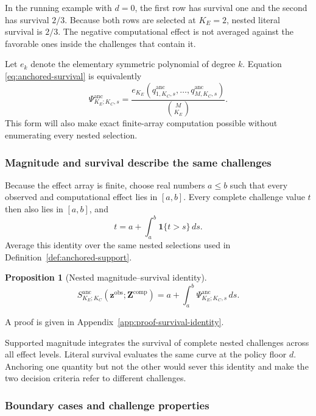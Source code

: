 \documentclass[11pt]{article}
\newcommand{\Sanc}{S^{\mathrm{anc}}}
\newcommand{\Psianc}{\Psi^{\mathrm{anc}}}
\newtheorem{proposition}{Proposition}
\theoremstyle{remark}
\begin{document}
In the running example with $d=0$, the first row has survival one and the
second has survival $2/3$. Because both rows are selected at $K_E=2$, nested
literal survival is $2/3$. The negative computational effect is not averaged
against the favorable ones inside the challenges that contain it.

Let $e_k$ denote the elementary symmetric polynomial of degree $k$. Equation
\eqref{eq:anchored-survival} is equivalently
\begin{equation}
\Psianc_{K_E;K_C,s}
=
\frac{e_{K_E}\left(
q^{\mathrm{anc}}_{1,K_C,s},\ldots,
q^{\mathrm{anc}}_{M,K_C,s}
\right)}{\binom{M}{K_E}}.
\label{eq:elementary-symmetric}
\end{equation}
This form will also make exact finite-array computation possible without
enumerating every nested selection.

\subsubsection{Magnitude and survival describe the same challenges}

Because the effect array is finite, choose real numbers $a\leq b$ such that
every observed and computational effect lies in $[a,b]$. Every complete
challenge value $t$ then also lies in $[a,b]$, and
\[
t=a+\int_a^b\mathbf 1\{t>s\}\,ds.
\]
Average this identity over the same nested selections used in
Definition~\ref{def:anchored-support}.

\begin{proposition}[Nested magnitude--survival identity]
\label{prop:survival-identity}
\begin{equation}
\Sanc_{K_E;K_C}
\left(\mathbf z^{\mathrm{obs}};\mathbf Z^{\mathrm{comp}}\right)
=
a+
\int_a^b
\Psianc_{K_E;K_C,s}\,ds.
\label{eq:nested-survival-identity}
\end{equation}
\end{proposition}

A proof is given in Appendix~\ref{app:proof-survival-identity}.

Supported magnitude integrates the survival of complete nested challenges
across all effect levels. Literal survival evaluates the same curve at the
policy floor $d$. Anchoring one quantity but not the other would sever this
identity and make the two decision criteria refer to different challenges.

\subsubsection{Boundary cases and challenge properties}
\label{sec:properties}
\end{document}
